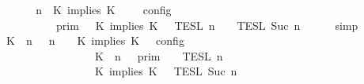 \begin{isabellebody}
\ {\isacharminus}\isanewline
\ \ \isamarkupfalse%
\ {\isacartoucheopen}{\isasymlbrakk}\ {\isasymGamma}{\isacharcomma}\ n\ {\isasymturnstile}\ {\isacharparenleft}K\ implies\ K\ {\isacharhash}\ {\isasymPsi}\ {\isasymtriangleright}\ {\isasymPhi}\ {\isasymrbrakk}\isactrlsub c\isactrlsub o\isactrlsub n\isactrlsub f\isactrlsub i\isactrlsub g\isanewline
\ \ \ \ \ \ \ \ {\isacharequal}\ {\isasymlbrakk}{\isasymlbrakk}\ {\isasymGamma}\ {\isasymrbrakk}{\isasymrbrakk}\isactrlsub p\isactrlsub r\isactrlsub i\isactrlsub m\ {\isasyminter}\ {\isasymlbrakk}{\isasymlbrakk}\ {\isacharparenleft}K\ implies\ K\ {\isacharhash}\ {\isasymPsi}\ {\isasymrbrakk}{\isasymrbrakk}\isactrlsub T\isactrlsub E\isactrlsub S\isactrlsub L\isactrlbsup {\isasymge}\ n\isactrlesup \ {\isasyminter}\ {\isasymlbrakk}{\isasymlbrakk}\ {\isasymPhi}\ {\isasymrbrakk}{\isasymrbrakk}\isactrlsub T\isactrlsub E\isactrlsub S\isactrlsub L\isactrlbsup {\isasymge}\ Suc\ n\isactrlesup {\isacartoucheclose}\isanewline
\ \ \ \ \isamarkupfalse%
\ simp\isanewline
\ \ \isamarkupfalse%
\ \isamarkupfalse%
\ {\isacartoucheopen}{\isasymlbrakk}\ {\isacharparenleft}{\isacharparenleft}K\ {\isasymnot}{\isasymUp}\ n{\isacharparenright}\ {\isacharhash}\ {\isasymGamma}{\isacharparenright}{\isacharcomma}\ n\ {\isasymturnstile}\ {\isasymPsi}\ {\isasymtriangleright}\ {\isacharparenleft}{\isacharparenleft}K\ implies\ K\ {\isacharhash}\ {\isasymPhi}{\isacharparenright}\ {\isasymrbrakk}\isactrlsub c\isactrlsub o\isactrlsub n\isactrlsub f\isactrlsub i\isactrlsub g\isanewline
\ \ \ \ \ \ \ \ \ \ \ \ \ \ \ \ {\isacharequal}\ {\isasymlbrakk}{\isasymlbrakk}\ {\isacharparenleft}K\ {\isasymnot}{\isasymUp}\ n{\isacharparenright}\ {\isacharhash}\ {\isasymGamma}\ {\isasymrbrakk}{\isasymrbrakk}\isactrlsub p\isactrlsub r\isactrlsub i\isactrlsub m\ {\isasyminter}\ {\isasymlbrakk}{\isasymlbrakk}\ {\isasymPsi}\ {\isasymrbrakk}{\isasymrbrakk}\isactrlsub T\isactrlsub E\isactrlsub S\isactrlsub L\isactrlbsup {\isasymge}\ n\isactrlesup \isanewline
\ \ \ \ \ \ \ \ \ \ \ \ \ \ \ \ {\isasyminter}\ {\isasymlbrakk}{\isasymlbrakk}\ {\isacharparenleft}K\ implies\ K\ {\isacharhash}\ {\isasymPhi}\ {\isasymrbrakk}{\isasymrbrakk}\isactrlsub T\isactrlsub E\isactrlsub S\isactrlsub L\isactrlbsup {\isasymge}\ Suc\ n\isactrlesup {\isacartoucheclose}\ \isamarkupfalse%

\end{isabellebody}
